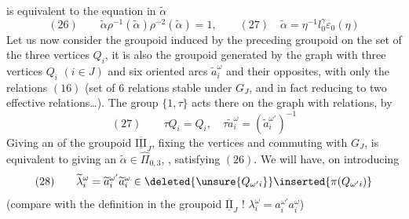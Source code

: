 is equivalent to the    equation in $\widetilde\alpha$
\[
(26)\qquad\widetilde\alpha\rho^{-1}(\widetilde\alpha)\rho^{-2}(\widetilde\alpha)=1,
\qquad\boxed{(27)\quad\widetilde\alpha=\eta^{-1}l_0^\gamma\varepsilon_0(\eta)}
\]
\deleted{$\unsure{\varepsilon}$}
Let us now consider the groupoid  induced by the preceding groupoid  on the set of the three vertices $Q_i$, it is also the groupoid generated by the graph with three vertices $Q_i$ $(i\in J)$ and six oriented arcs $\widetilde a_i^\omega$ and their opposites, with only the relations $(16)$ (set of 6 relations stable under $G_J$, and in fact reducing to two effective relations\ldots).
The group $\{1,\tau\}$ acts there on the graph with relations, by
\[
(27)\qquad\tau Q_i=Q_i,\quad\tau\widetilde a_i^\omega=(\widetilde a_i^{\omega'})^{-1}
\]
Giving an   of the groupoid $\overline{\underline{\mathrm{III}}}_J$, fixing the vertices and commuting with $G_J$, is equivalent to giving an $\widetilde\alpha\in\widehat\Pi_{0,3}$, , satisfying  $(26)$. We will have, on introducing
\[
(28)\qquad\widetilde\lambda_i^\omega=\widetilde a_i^{\omega'}\widetilde a_i^\omega\in\deleted{\unsure{Q_{\omega'i}}}\inserted{\pi(Q_{\omega'i})}
\]
(compare with the definition in the groupoid $\overline{\underline{\mathrm{II}}}_J$ ! $\lambda_i^\omega=a_i^{\omega'}a_i^\omega$)

